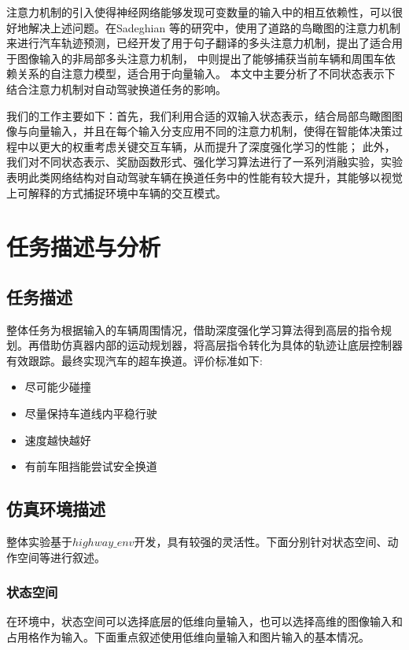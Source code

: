 \documentclass[letterpaper, 10 pt, conference]{ieeeconf}  %
\begin{document}
注意力机制的引入使得神经网络能够发现可变数量的输入中的相互依赖性，可以很好地解决上述问题。在Sadeghian 等\cite{sadeghian2018car}的研究中，使用了道路的鸟瞰图的注意力机制来进行汽车轨迹预测，\cite{vaswani2017attention}已经开发了用于句子翻译的多头注意力机制，\cite{messaoud2019non}提出了适合用于图像输入的非局部多头注意力机制，\cite{leurent2019social}
中则提出了能够捕获当前车辆和周围车依赖关系的自注意力模型，适合用于向量输入。
本文中主要分析了不同状态表示下结合注意力机制对自动驾驶换道任务的影响。

我们的工作主要如下：首先，我们利用合适的双输入状态表示，结合局部鸟瞰图图像与向量输入，并且在每个输入分支应用不同的注意力机制，使得在智能体决策过程中以更大的权重考虑关键交互车辆，从而提升了深度强化学习的性能；
此外，我们对不同状态表示、奖励函数形式、强化学习算法进行了一系列消融实验，实验表明此类网络结构对自动驾驶车辆在换道任务中的性能有较大提升，其能够以视觉上可解释的方式捕捉环境中车辆的交互模式。


\section{任务描述与分析}

\subsection{任务描述}

整体任务为根据输入的车辆周围情况，借助深度强化学习算法得到高层的指令规划。再借助仿真器内部的运动规划器，将高层指令转化为具体的轨迹让底层控制器有效跟踪。最终实现汽车的超车换道。评价标准如下:
\begin{itemize}
    \item 尽可能少碰撞
    \item 尽量保持车道线内平稳行驶
    \item 速度越快越好
    \item 有前车阻挡能尝试安全换道
\end{itemize}

\subsection{仿真环境描述}
整体实验基于$highway\_env$\cite{highway-env}开发，具有较强的灵活性。下面分别针对状态空间、动作空间等进行叙述。

\subsubsection{状态空间}
在环境中，状态空间可以选择底层的低维向量输入，也可以选择高维的图像输入和占用格作为输入。下面重点叙述使用低维向量输入和图片输入的基本情况。
\end{document}
